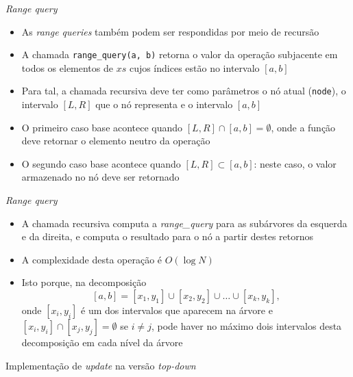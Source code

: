 \begin{frame}[fragile]{\it Range query}

    \begin{itemize}
        \item As \textit{range queries} também podem ser respondidas por meio de recursão

        \item A chamada \texttt{range\_query(a, b)} retorna o valor da operação subjacente em todos
            os elementos de $xs$ cujos índices estão no intervalo $[a, b]$

        \item Para tal, a chamada recursiva deve ter como parâmetros o nó atual (\texttt{node}),
            o intervalo $[L, R]$ que o nó representa e o intervalo $[a, b]$

        \item O primeiro caso base acontece quando $[L, R]\cap [a, b] = \emptyset$, onde a
            função deve retornar o elemento neutro da operação

        \item O segundo caso base acontece quando $[L, R]\subset [a, b]$: neste caso, o valor
            armazenado no nó deve ser retornado

    \end{itemize}

\end{frame}

\begin{frame}[fragile]{\it Range query}

    \begin{itemize}
        \item A chamada recursiva computa a \textit{range\_query} para as subárvores da esquerda
            e da direita, e computa o resultado para o nó a partir destes retornos

        \item A complexidade desta operação é $O(\log N)$

        \item Isto porque, na decomposição 
            \[
                [a, b] = [x_1, y_1]\cup [x_2, y_2]\cup \ldots \cup [x_k, y_k],
            \] 
            onde $[x_i, y_i]$ é um dos intervalos que aparecem na árvore e $[x_i, y_i]\cap
                [x_j, y_j] = \emptyset$ se $i\neq j$, pode haver no máximo dois intervalos
                desta decomposição em cada nível da árvore
    \end{itemize}

\end{frame}



\begin{frame}[fragile]{Implementação de {\it update} na versão {\it top-down}}
\end{frame}
